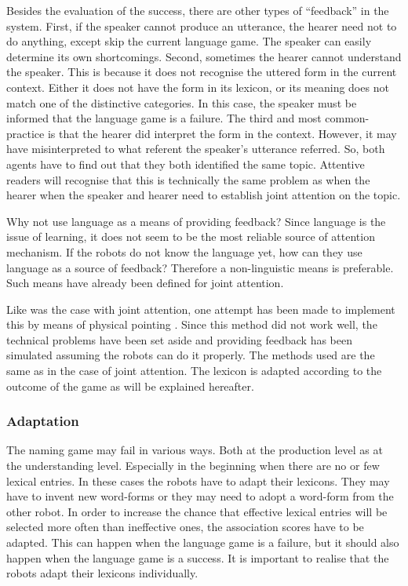Besides the evaluation of the success, there are other types of ``feedback'' in the system. First, if the speaker cannot produce an utterance, the hearer need not to do anything, except skip the current language game. The speaker can easily determine its own shortcomings. Second, sometimes the hearer cannot understand the speaker. This is because it does not recognise the uttered form in the current context. Either it does not have the form in its lexicon, or its meaning does not match one of the distinctive categories. In this case, the speaker must be informed that the language game is a failure. The third and most common-practice is that the hearer did interpret the form in the context. However, it may have misinterpreted to what referent the speaker's utterance referred. So, both agents have to find out that they both identified the same topic. Attentive readers will recognise that this is technically the same problem as when the hearer when the speaker and hearer need to establish joint attention on the topic.

Why not use language as a means of providing feedback? Since language is the issue of learning, it does not seem to be the most reliable source of attention mechanism.  If the robots do not know the language yet, how can they use language as a source of feedback? Therefore a non-linguistic means is preferable. Such means have already been defined for joint attention.

Like was the case with joint attention, one attempt has been made to implement this by means of physical pointing \citep{vogt:1998b}. Since this method did not work well, the technical problems have been set aside and providing feedback has been simulated assuming the robots can do it properly. The methods used are the same as in the case of joint attention. The lexicon is adapted according to the outcome of the game as will be explained hereafter.

\subsubsection{Adaptation}

The naming game may fail in various ways. Both at the production level as at the understanding level. Especially in the beginning when there are no or few lexical entries. In these cases the robots have to adapt their lexicons. They may have to invent new word-forms or they may need to adopt a word-form from the other robot. In order to increase the chance that effective lexical entries will be selected more often than ineffective ones, the association scores have to be adapted. This can happen when the language game is a failure, but it should also happen when the language game is a success. It is important to realise that the robots adapt their lexicons individually.

